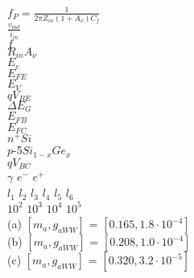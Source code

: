 \documentclass[a4paper, 11pt, twoside]{report}
\begin{document}
	
	$ f_P = \frac{1}{2\pi Z_{in} {\left( 1 + A_\nu \right)C_f}}$ \\
	
	$\frac{v_{out}}{i_{in}}$ \\
	
	$f$ \\
	
	$R_{in} A_{\nu}$ \\
	
	$E_c$\\
	
	$E_{FE}$\\
	
	$E_V$\\
	
	$qV_{BE}$\\
	
	$\Delta E_G$\\
	
	$E_{FB}$\\
	
	$E_{FC}$\\
	
	$n^+ Si$\\
	
	$p$-5$Si_{1-x} Ge_x$\\
	
	$qV_{BC}$\\
	

	$\gamma$
	$e^-$
	$e^+$\\
	
	$l_1$ $l_2$ $l_3$ $l_4$ $l_5$ $l_6$\\
	
	$10^2$ $10^3$ $10^4$ $10^5$ \\
	
	(a) $\left[m_a, g_{aWW}\right]$ = $\left[0.165, 1.8\cdot 10^{-4}\right]$ \\
	
	(b) $\left[m_a, g_{aWW}\right]$ = $\left[0.208, 1.0\cdot 10^{-4}\right]$ \\
	
	(c) $\left[m_a, g_{aWW}\right]$ = $\left[0.320, 3.2\cdot 10^{-5}\right]$ \\
	

	
\end{document}
